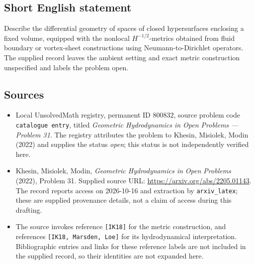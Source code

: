 \documentclass[11pt]{article}
\begin{document}
\subsection{Short English statement}
Describe the differential geometry of spaces of closed hypersurfaces enclosing a fixed volume, equipped with the nonlocal \(H^{-1/2}\)-metrics obtained from fluid boundary or vortex-sheet constructions using Neumann-to-Dirichlet operators. The supplied record leaves the ambient setting and exact metric construction unspecified and labels the problem open.
\subsection{Sources}
\begin{itemize}
\item Local UnsolvedMath registry, permanent ID \(800832\), source problem code \texttt{catalogue entry}, titled \emph{Geometric Hydrodynamics in Open Problems --- Problem 31}. The registry attributes the problem to Khesin, Misiolek, Modin (2022) and supplies the status \emph{open}; this status is not independently verified here.
\item Khesin, Misiolek, Modin, \emph{Geometric Hydrodynamics in Open Problems} (2022), Problem 31. Supplied source URL: \url{https://arxiv.org/abs/2205.01143}. The record reports access on 2026-10-16 and extraction by \texttt{arxiv\_latex}; these are supplied provenance details, not a claim of access during this drafting.
\item The source invokes reference \texttt{[IK18]} for the metric construction, and references \texttt{[IK18, Marsden, Loe]} for its hydrodynamical interpretation. Bibliographic entries and links for these reference labels are not included in the supplied record, so their identities are not expanded here.
\end{itemize}
\end{document}
